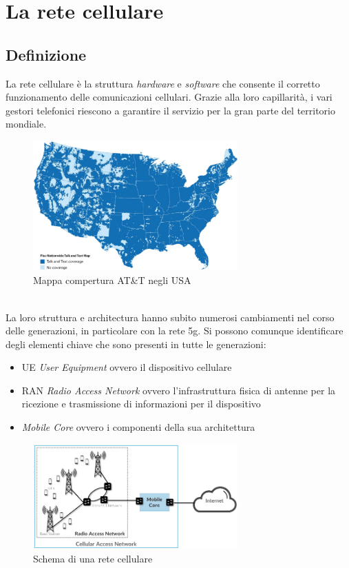 \section{La rete cellulare}
\subsection{Definizione}
La rete cellulare è la struttura \textit{hardware} e \textit{software} che consente il corretto
funzionamento delle comunicazioni cellulari.
Grazie alla loro capillarità, i vari gestori telefonici riescono a garantire il servizio per la 
gran parte del territorio mondiale.
\begin{figure}[h]
    \centering
    \includegraphics[width=0.7\textwidth]{images/att-coverage.png}
    \caption{Mappa compertura AT\&T negli USA}
\end{figure}\\
La loro struttura e architectura hanno subito numerosi cambiamenti nel corso delle generazioni, in particolare con la rete
5g. Si possono comunque identificare degli elementi chiave che sono presenti in tutte le generazioni:
\begin{itemize}
    \item UE \textit{User Equipment} ovvero il dispositivo cellulare
    \item RAN \textit{Radio Access Network} ovvero l'infrastruttura fisica di antenne per la ricezione e trasmissione di informazioni per il dispositivo
    \item \textit{Mobile Core} ovvero i componenti della sua architettura
\end{itemize}
\begin{figure}[h]
    \centering
    \includegraphics[width=0.7\textwidth]{images/cellular-network-basic-scheme.png}
    \caption{Schema di una rete cellulare}
\end{figure}

